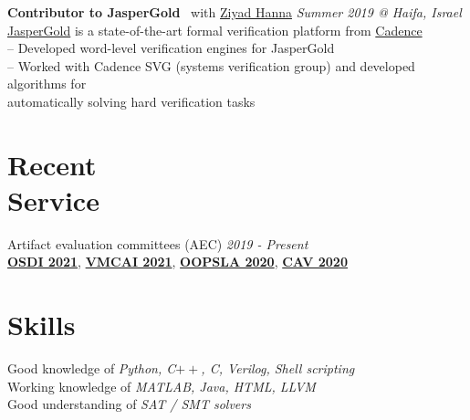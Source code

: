 \documentclass[line,margin,letter]{resume}
\begin{document}
\begin{resume}
    \textbf{Contributor to JasperGold}~ with \href{https://www.linkedin.com/in/ziyad-hanna-0225041}{Ziyad Hanna} \hfill \emph{Summer 2019 @ Haifa, Israel}\\ 
    \phantom{xx}\hspace{1ex} \href{https://www.cadence.com/content/cadence-www/global/en_US/home/tools/system-design-and-verification/formal-and-static-verification/jasper-gold-verification-platform.html}{JasperGold} is a state-of-the-art formal verification platform from \href{https://www.cadence.com/}{Cadence} \\
    \phantom{xx}\hspace{1ex} -- Developed word-level verification engines for JasperGold \\
    \phantom{xx}\hspace{1ex} -- Worked with Cadence SVG (systems verification group) and developed algorithms for \\
    \phantom{xx}\hspace{3ex} automatically solving hard verification tasks

\section{\mysidestyle Recent\\Service}
    Artifact evaluation committees (AEC) \hfill \emph{2019 - Present}\\
    \phantom{x} \href{https://www.usenix.org/conference/osdi21}{\textbf{OSDI 2021}}, \href{https://popl21.sigplan.org/home/VMCAI-2021}{\textbf{VMCAI 2021}}, \href{https://2020.splashcon.org/track/splash-2020-Artifacts}{\textbf{OOPSLA 2020}}, \href{http://i-cav.org/2020/}{\textbf{CAV 2020}}
    
    


\section{\mysidestyle Skills}
    Good knowledge of \emph{Python, C$++$, C, Verilog, Shell scripting} \\
    Working knowledge of \emph{MATLAB, Java, HTML, LLVM}  \\
    Good understanding of \emph{SAT / SMT solvers}


\end{resume}
\end{document}
